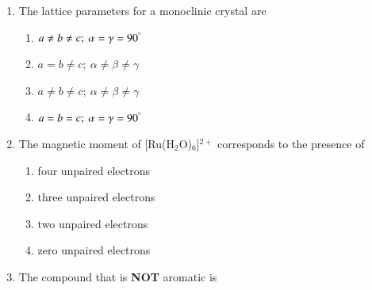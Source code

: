 \documentclass[12pt]{article}
\begin{document}
\begin{enumerate}
\item  The lattice parameters for a monoclinic crystal are
\begin{enumerate}
    \item  $a \neq b \neq c; \ \alpha = \gamma = 90^\degree$
    \item  $a = b \neq c; \ \alpha \neq \beta \neq \gamma$
    \item $a \neq b \neq c; \ \alpha \neq \beta \neq \gamma$\
    \item  $a = b = c; \ \alpha = \gamma = 90^\degree$    \hfill{}
\end{enumerate}
    



    \item The magnetic moment of [Ru(H$_2$O)$_6$]$^{2+}$
 corresponds to the presence of
    \begin{enumerate}
    \item  four unpaired electrons 
    \item  three unpaired electrons
    \item  two unpaired electrons 
    \item  zero unpaired electrons    \hfill{}
    \end{enumerate}

    

    \item The compound that is \textbf{NOT} aromatic is




\end{enumerate}
\end{document}
